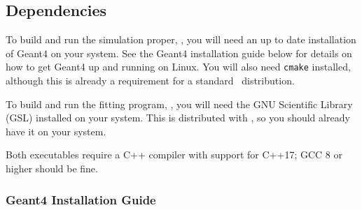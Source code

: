 \documentclass[12pt]{article}
\begin{document}
\subsection{Dependencies}
\label{s:deps}
To build and run the simulation proper, \exes, you will need an up to date installation of Geant4 on your system.
See the Geant4 installation guide below for details on how to get Geant4 up and running on Linux.
You will also need \texttt{cmake} installed, although this is already a requirement for a standard \bmad \, distribution.

To build and run the fitting program, \exef, you will need the GNU Scientific Library (GSL) installed on your system.
This is distributed with \bmad, so you should already have it on your system.

Both executables require a C++ compiler with support for C++17; GCC 8 or higher should be fine.
\subsubsection{Geant4 Installation Guide}
\end{document}
